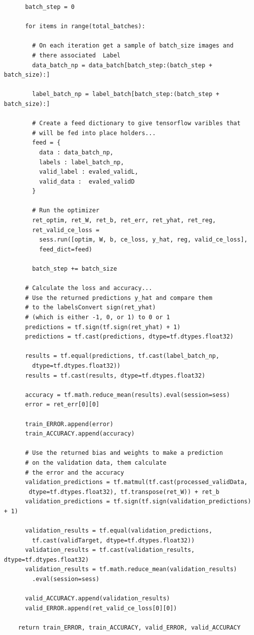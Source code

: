\documentclass[12pt]{article}
\begin{document}
\begin{verbatim}
      batch_step = 0

      for items in range(total_batches):
        
        # On each iteration get a sample of batch_size images and 
        # there associated  Label
        data_batch_np = data_batch[batch_step:(batch_step + batch_size):]

        label_batch_np = label_batch[batch_step:(batch_step + batch_size):]

        # Create a feed dictionary to give tensorflow varibles that  
        # will be fed into place holders...
        feed = {
          data : data_batch_np,
          labels : label_batch_np,
          valid_label : evaled_validL,
          valid_data :  evaled_validD
        }

        # Run the optimizer 
        ret_optim, ret_W, ret_b, ret_err, ret_yhat, ret_reg, 
        ret_valid_ce_loss = 
          sess.run([optim, W, b, ce_loss, y_hat, reg, valid_ce_loss],
          feed_dict=feed)

        batch_step += batch_size
    
      # Calculate the loss and accuracy...
      # Use the returned predictions y_hat and compare them 
      # to the labelsConvert sign(ret_yhat) 
      # (which is either -1, 0, or 1) to 0 or 1
      predictions = tf.sign(tf.sign(ret_yhat) + 1)
      predictions = tf.cast(predictions, dtype=tf.dtypes.float32)

      results = tf.equal(predictions, tf.cast(label_batch_np, 
        dtype=tf.dtypes.float32))
      results = tf.cast(results, dtype=tf.dtypes.float32)

      accuracy = tf.math.reduce_mean(results).eval(session=sess)
      error = ret_err[0][0]

      train_ERROR.append(error)
      train_ACCURACY.append(accuracy)

      # Use the returned bias and weights to make a prediction 
      # on the validation data, them calculate 
      # the error and the accuracy
      validation_predictions = tf.matmul(tf.cast(processed_validData,
       dtype=tf.dtypes.float32), tf.transpose(ret_W)) + ret_b
      validation_predictions = tf.sign(tf.sign(validation_predictions) + 1)

      validation_results = tf.equal(validation_predictions, 
        tf.cast(validTarget, dtype=tf.dtypes.float32))
      validation_results = tf.cast(validation_results, dtype=tf.dtypes.float32)
      validation_results = tf.math.reduce_mean(validation_results)
        .eval(session=sess)

      valid_ACCURACY.append(validation_results)
      valid_ERROR.append(ret_valid_ce_loss[0][0])

    return train_ERROR, train_ACCURACY, valid_ERROR, valid_ACCURACY  
\end{verbatim}
\end{document}
